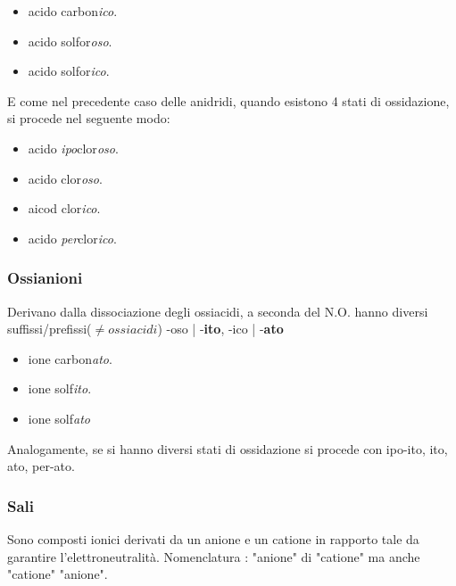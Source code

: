 \begin{itemize}
    \item {} acido carbon\emph{ico}.
    \item {} acido solfor\emph{oso}.
    \item {} acido solfor\emph{ico}.
\end{itemize}
E come nel precedente caso delle anidridi, quando esistono 4 stati di ossidazione, si procede nel seguente modo: 
\begin{itemize}
    \item {} acido \emph{ipo}clor\emph{oso}.
    \item {} acido clor\emph{oso}.
    \item {} aicod clor\emph{ico}.
    \item {} acido \emph{per}clor\emph{ico}.
\end{itemize}


\subsubsection{Ossianioni}
Derivano dalla dissociazione degli ossiacidi, a seconda del N.O. hanno diversi suffissi/prefissi($\neq ossiacidi$)
 -oso | -\textbf{ito}, -ico | -\textbf{ato}

 \begin{itemize}
     \item {} ione carbon\emph{ato}.
     \item {} ione solf\emph{ito}.
     \item {} ione solf\emph{ato}
 \end{itemize} 

Analogamente, se si hanno diversi stati di ossidazione si procede con ipo-ito, ito, ato, per-ato. 

\subsubsection{Sali}
Sono composti ionici derivati da un anione e un catione in rapporto tale da garantire l'elettroneutralità. 
Nomenclatura : "anione" di "catione" ma anche "catione" "anione".

